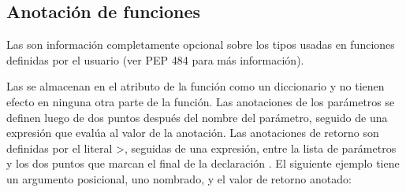 \documentclass[a4,10pt,spanish]{sphinxmanual}
\begin{document}
\subsection{Anotación de funciones}
\label{\detokenize{tutorial/controlflow:function-annotations}}\label{\detokenize{tutorial/controlflow:tut-annotations}}
\ignorespaces 
\sphinxAtStartPar
Las  son información completamente opcional sobre los tipos usadas en funciones definidas por el usuario (ver PEP 484 para más información).

\sphinxAtStartPar
Las {\hyperref[\detokenize{glossary:term-function-annotation}]{}} se almacenan en el atributo  de la función como un diccionario y no tienen efecto en ninguna otra parte de la función. Las anotaciones de los parámetros se definen luego de dos puntos después del nombre del parámetro, seguido de una expresión que evalúa al valor de la anotación. Las anotaciones de retorno son definidas por el literal \sphinxhyphen{}>, seguidas de una expresión, entre la lista de parámetros y los dos puntos que marcan el final de la declaración . El siguiente ejemplo tiene un argumento posicional, uno nombrado, y el valor de retorno anotado:

\begin{sphinxVerbatim}[commandchars=\\\{\}]
        
     
      
         
\end{sphinxVerbatim}
\end{document}
